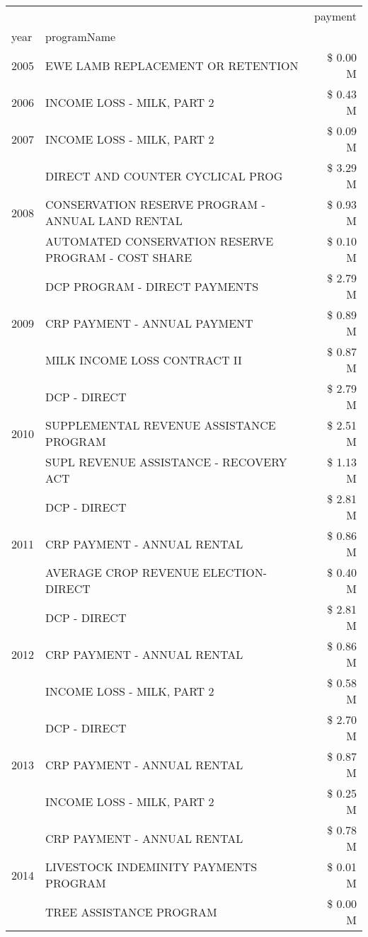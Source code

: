 \begin{tabular}{llr}
\toprule
 &  & payment \\
year & programName &  \\
\midrule
2005 & EWE LAMB REPLACEMENT OR RETENTION & \$ 0.00 M \\
\cline{1-3}
2006 & INCOME LOSS - MILK, PART 2 & \$ 0.43 M \\
\cline{1-3}
2007 & INCOME LOSS - MILK, PART 2 & \$ 0.09 M \\
\cline{1-3}
\multirow[t]{3}{*}{2008} & DIRECT AND COUNTER CYCLICAL PROG & \$ 3.29 M \\
 & CONSERVATION RESERVE PROGRAM - ANNUAL LAND RENTAL & \$ 0.93 M \\
 & AUTOMATED CONSERVATION RESERVE PROGRAM - COST SHARE & \$ 0.10 M \\
\cline{1-3}
\multirow[t]{3}{*}{2009} & DCP PROGRAM - DIRECT PAYMENTS & \$ 2.79 M \\
 & CRP PAYMENT - ANNUAL PAYMENT & \$ 0.89 M \\
 & MILK INCOME LOSS CONTRACT II & \$ 0.87 M \\
\cline{1-3}
\multirow[t]{3}{*}{2010} & DCP - DIRECT & \$ 2.79 M \\
 & SUPPLEMENTAL REVENUE ASSISTANCE PROGRAM & \$ 2.51 M \\
 & SUPL REVENUE ASSISTANCE - RECOVERY ACT & \$ 1.13 M \\
\cline{1-3}
\multirow[t]{3}{*}{2011} & DCP - DIRECT & \$ 2.81 M \\
 & CRP PAYMENT - ANNUAL RENTAL & \$ 0.86 M \\
 & AVERAGE CROP REVENUE ELECTION-DIRECT & \$ 0.40 M \\
\cline{1-3}
\multirow[t]{3}{*}{2012} & DCP - DIRECT & \$ 2.81 M \\
 & CRP PAYMENT - ANNUAL RENTAL & \$ 0.86 M \\
 & INCOME LOSS - MILK, PART 2 & \$ 0.58 M \\
\cline{1-3}
\multirow[t]{3}{*}{2013} & DCP - DIRECT & \$ 2.70 M \\
 & CRP PAYMENT - ANNUAL RENTAL & \$ 0.87 M \\
 & INCOME LOSS - MILK, PART 2 & \$ 0.25 M \\
\cline{1-3}
\multirow[t]{3}{*}{2014} & CRP PAYMENT - ANNUAL RENTAL & \$ 0.78 M \\
 & LIVESTOCK INDEMINITY PAYMENTS PROGRAM & \$ 0.01 M \\
 & TREE ASSISTANCE PROGRAM & \$ 0.00 M \\
\cline{1-3}

\end{tabular}
